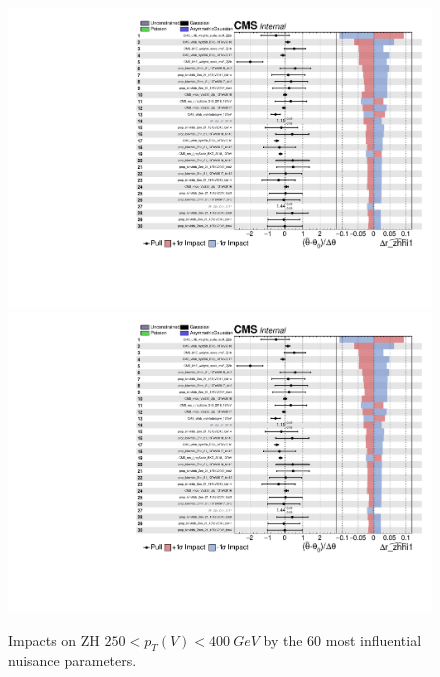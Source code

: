 \begin{figure}
  \centering
  \includegraphics[width=0.85\linewidth,page=1]{figures/impacts/impacts_r_zhhi1.pdf}
  \includegraphics[width=0.85\linewidth,page=2]{figures/impacts/impacts_r_zhhi1.pdf}
  \caption[Impacts for ZH $250 < p_T(V) < \SI{400}{GeV}$]{
    Impacts on ZH $250 < p_T(V) < \SI{400}{GeV}$ by the 60 most influential nuisance parameters.
  }
  \label{fig:impacts_r_zhhi1}
\end{figure}

